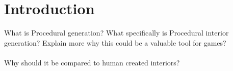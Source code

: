 \section{Introduction}
    What is Procedural generation? 
    What specifically is Procedural interior generation?
    Explain more why this could be a valuable tool for games?\\
    \\
    Why should it be compared to human created interiors?